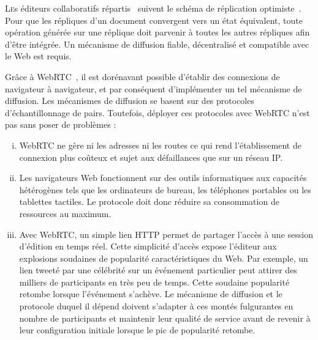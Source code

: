 

\lettrine{L}es éditeurs collaboratifs répartis~\cite{ellis1991groupware} suivent
le schéma de réplication optimiste~\cite{demers1987epidemic,
  johnson1975maintenance, ladin1992providing, saito2005optimistic}. Pour que les
répliques d'un document convergent vers un état équivalent, toute opération
générée sur une réplique doit parvenir à toutes les autres répliques afin d'être
intégrée. Un mécanisme de diffusion fiable, décentralisé et compatible avec le
Web est requis.

Grâce à WebRTC~\cite{webrtc}, il est dorénavant possible d'établir des
connexions de navigateur à navigateur, et par conséquent d'implémenter un tel
mécanisme de diffusion.
Les mécanismes de diffusion se basent sur des protocoles d'échantillonnage de
pairs. Toutefois, déployer ces protocoles avec WebRTC n'est pas sans poser de
problèmes :
\begin{enumerate}[(i)]
\item WebRTC ne gère ni les adresses ni les routes ce qui rend l'établissement
  de connexion plus coûteux et sujet aux défaillances que sur un réseau IP.
\item Les navigateurs Web fonctionnent sur des outils informatiques aux
  capacités hétérogènes tels que les ordinateurs de bureau, les téléphones
  portables ou les tablettes tactiles. Le protocole doit donc réduire sa
  consommation de ressources au maximum.
\item Avec WebRTC, un simple lien HTTP %
  permet de partager l'accès à une session d'édition en temps réel. Cette
  simplicité d'accès expose l'éditeur aux explosions soudaines de popularité
  caractéristiques du Web.  Par exemple, un lien \og tweeté \fg par une
  célébrité sur un événement particulier peut attirer des milliers de
  participants en très peu de temps. Cette soudaine popularité retombe lorsque
  l'événement s'achève.  Le mécanisme de diffusion et le protocole duquel il
  dépend doivent s'adapter à ces montés fulgurantes en nombre de participants et
  maintenir leur qualité de service avant de revenir à leur configuration
  initiale lorsque le pic de popularité retombe.
\end{enumerate}


